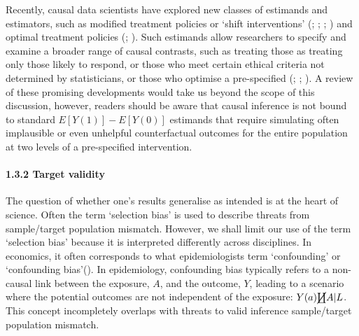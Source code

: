 \documentclass[
  singlecolumn]{article}
\let\oldparagraph\paragraph
\renewcommand{\paragraph}[1]{\oldparagraph{#1}\mbox{}}
\begin{document}
Recently, causal data scientists have explored new classes of estimands
and estimators, such as modified treatment policies or `shift
interventions' (;
;
;
) and optimal
treatment policies (;
). Such estimands
allow researchers to specify and examine a broader range of causal
contrasts, such as treating those as treating only those likely to
respond, or those who meet certain ethical criteria not determined by
statisticians, or those who optimise a pre-specified
(;
;
). A review of these
promising developments would take us beyond the scope of this
discussion, however, readers should be aware that causal inference is
not bound to standard \(E[Y(1)] - E[Y(0)]\) estimands that require
simulating often implausible or even unhelpful counterfactual outcomes
for the entire population at two levels of a pre-specified intervention.

\paragraph{1.3.2 Target validity}\label{target-validity}

The question of whether one's results generalise as intended is at the
heart of science. Often the term `selection bias' is used to describe
threats from sample/target population mismatch. However, we shall limit
our use of the term `selection bias' because it is interpreted
differently across disciplines. In economics, it often corresponds to
what epidemiologists term `confounding' or `confounding
bias'(). In
epidemiology, confounding bias typically refers to a non-causal link
between the exposure, \(A\), and the outcome, \(Y\), leading to a
scenario where the potential outcomes are not independent of the
exposure: \(Y(a)\cancel\coprod A|L\). This concept incompletely overlaps
with threats to valid inference sample/target population mismatch.
\end{document}
